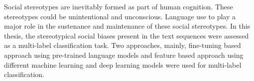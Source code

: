 Social stereotypes are inevitably formed as part of human cognition. These stereotypes could be unintentional and unconscious. Language use to play a major role in the sustenance and maintenance of these social stereotypes. In this thesis, the stereotypical social biases present in the text sequences were assessed as a multi-label classification task. Two approaches, mainly, fine-tuning based approach using pre-trained language models and feature based approach using different machine learning and deep learning models were used for multi-label classification. 